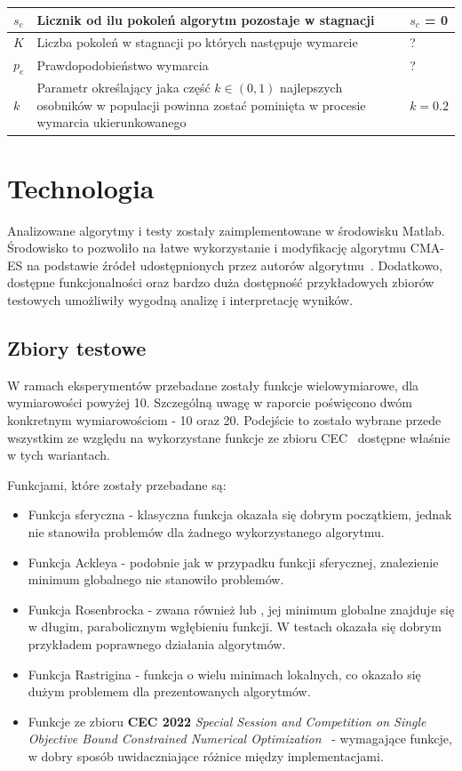\documentclass[10pt]{article}
\begin{document}
\begin{center}
\begin{tabular}{ |p{2cm}|p{7cm}|p{4cm}| }
\hline
$s_c$ & Licznik od ilu pokoleń algorytm pozostaje w stagnacji & $s_c$ = 0 \\
\hline
$K$ & Liczba pokoleń w stagnacji po których następuje wymarcie & ? \\
\hline
$p_e$ & Prawdopodobieństwo wymarcia & ? \\
\hline
$k$ & Parametr określający jaka część $k \in (0,1)$ najlepszych osobników w populacji powinna zostać pominięta w procesie wymarcia ukierunkowanego  & $k=0.2$ \\
\hline
\end{tabular}
\end{center}

\section{Technologia}
Analizowane algorytmy i testy zostały zaimplementowane w środowisku Matlab. Środowisko to pozwoliło na łatwe wykorzystanie i modyfikację algorytmu CMA-ES na podstawie źródeł udostępnionych przez autorów algorytmu~\cite{matlab}. Dodatkowo, dostępne funkcjonalności oraz bardzo duża dostępność przykładowych zbiorów testowych umożliwiły wygodną analizę i interpretację wyników.

\subsection{Zbiory testowe}
\label{sec:benchmarks}
W ramach eksperymentów przebadane zostały funkcje wielowymiarowe, dla wymiarowości powyżej 10. Szczególną uwagę w raporcie poświęcono dwóm konkretnym wymiarowościom - 10 oraz 20. Podejście to zostało wybrane przede wszystkim ze względu na wykorzystane funkcje ze zbioru CEC~\cite{CEC} dostępne właśnie w tych wariantach.  

Funkcjami, które zostały przebadane są:
\begin{itemize}
    \item Funkcja sferyczna - klasyczna funkcja okazała się dobrym początkiem, jednak nie stanowiła problemów dla żadnego wykorzystanego algorytmu.
    \item Funkcja Ackleya  - podobnie jak w przypadku funkcji sferycznej, znalezienie minimum globalnego nie stanowiło problemów.
    \item Funkcja Rosenbrocka - zwana również  lub , jej minimum globalne znajduje się w długim, parabolicznym wgłębieniu funkcji. W testach okazała się dobrym przykładem poprawnego działania algorytmów.
    \item Funkcja Rastrigina - funkcja o wielu minimach lokalnych, co okazało się dużym problemem dla prezentowanych algorytmów. 
    \item Funkcje ze zbioru \textbf{CEC 2022} \textit{Special Session and Competition on Single Objective Bound Constrained Numerical Optimization}~\cite{CEC} - wymagające funkcje, w dobry sposób uwidaczniające różnice między implementacjami.
\end{itemize}
\end{document}
